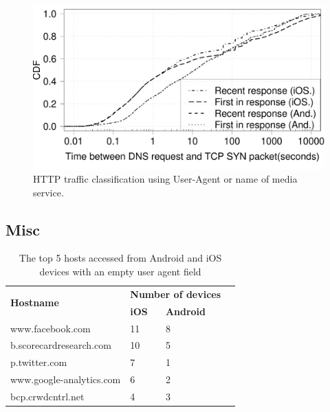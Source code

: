 \begin{figure}
\includegraphics[width=\columnwidth]{plots/sslanalysis_dns_timediff_distrib.pdf}
\caption{HTTP traffic classification using User-Agent or name of media service.}
\label{fig:http-classification-app-service}
\end{figure}



\subsection{Misc}

\begin{table}
\begin{tabular}{|l|l|l|l|}
\hline
\multirow{2}{*}{\bf Hostname} & \multicolumn{2}{|c|}{\bf Number of devices}\tabularnewline
\cline{2-3}
    & {\bf iOS} & {\bf Android} \tabularnewline
\hline
www.facebook.com & 11 & 8 \tabularnewline
b.scorecardresearch.com	& 10 &	5 \tabularnewline
p.twitter.com	& 7 & 1 \tabularnewline
www.google-analytics.com &  6 & 2 \tabularnewline
bcp.crwdcntrl.net & 4 &	3 \tabularnewline
\hline
\end{tabular}
\caption{The top 5 hosts accessed from Android and iOS devices with an empty user agent field}
\label{tab:top-hosts-empty-agent}
\end{table}





